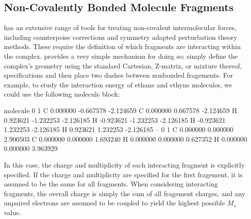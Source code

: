 \subsection{Non-Covalently Bonded Molecule Fragments}

\PSIfour has an extensive range of tools for treating non-covalent
intermolecular forces, including counterpoise corrections and symmetry adapted
perturbation theory methods. These require the definition of which fragments
are interacting within the complex. \PSIfour provides a very simple mechanism
for doing so; simply define the complex’s geometry using the standard
Cartesian, Z-matrix, or mixture thereof, specifications and then place two
dashes between nonbonded fragements. For example, to study the interaction
energy of ethane and ethyne molecules, we could use the following molecule
block:
\begin{Snippet}
molecule{
  0 1
  C  0.000000 -0.667578  -2.124659
  C  0.000000  0.667578  -2.124659
  H  0.923621 -1.232253  -2.126185
  H -0.923621 -1.232253  -2.126185
  H -0.923621  1.232253  -2.126185
  H  0.923621  1.232253  -2.126185
  --
  0 1
  C 0.000000 0.000000 2.900503
  C 0.000000 0.000000 1.693240 
  H 0.000000 0.000000 0.627352
  H 0.000000 0.000000 3.963929
}
\end{Snippet}
In this case, the charge and multiplicity of each interacting fragment is
explicitly specified. If the charge and multiplicity are specified for the
first fragement, it is assumed to be the same for all fragments. When
considering interacting fragments, the overall charge is simply the sum of all
fragement charges, and any unpaired electrons are assumed to be coupled to
yield the highest possible $M_s$ value.

